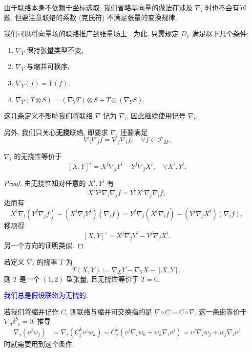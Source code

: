 \begin{remark}
	由于联络本身不依赖于坐标选取, 我们省略基向量的做法在涉及 $\nabla_i$ 时也不会有问题. 但要注意联络的系数 (克氏符) 不满足张量的变换规律.
\end{remark}
我们可以将向量场的联络推广到张量场上 \cite[\S 6.2.2]{陈维桓2013微分几何引论}. 为此, 只需规定 $D_Y$ 满足以下几个条件:
\begin{enumerate}
	\item $\nabla_Y$ 保持张量类型不变,
	\item $\nabla_Y$ 与缩并可换序,
	\item $\nabla_Y(f)=Y(f)$,
	\item $\nabla_Y(T\otimes S)=(\nabla_YT)\otimes S+T\otimes(\nabla_YS)$.
\end{enumerate}
\begin{remark}
	这几条定义不影响我们将联络 $\nabla$ 记为 $\nabla_i$, 因此继续使用记号 $\nabla_i$.
\end{remark}
另外, 我们只关心{\bf 无挠}联络, 即要求 $\nabla_i$ 还要满足
\[ \nabla_i\nabla_j f=\nabla_j\nabla_i f,\quad \forall f\in\mathcal{F}_M. \] 

\begin{theorem}
\label{torsion} 
	$\nabla_i$ 的无挠性等价于
	\[ [X,Y]^i=X^j\nabla_jY^i-Y^j\nabla_jX^i,\quad \forall X^i,Y^i. \]
\end{theorem}
\begin{proof}
	由无挠性知对任意的 $X^i,Y^i$ 有
	\[ X^iY^j\nabla_i\nabla_j f=Y^jX^i\nabla_j\nabla_i f, \]
	进而有
	\[ X^i\nabla_i(Y^j\nabla_j f)-(X^i\nabla_iY^j)(\nabla_j f)=Y^j\nabla_j(X^i\nabla_i f)-(Y^j\nabla_jX^i)(\nabla_if), \]
	移项得
	\[ [X,Y]^i=X^j\nabla_jY^i-Y^j\nabla_jX^i. \] 
	另一个方向的证明类似.
\end{proof}

\begin{remark}
	若定义 $\nabla_i$ 的挠率 $T$ 为
	\[ T(X,Y):=\nabla_XY-\nabla_YX-[X,Y], \] 
	则 $T$ 是一个 $(1,2)$ 型张量, 且无挠性等价于 $T=0$.
\end{remark}

\textcolor{blue}{我们总是假设联络为无挠的.}

\begin{remark}
	若我们将缩并记作 $C$, 则联络与缩并可交换指的是 $\nabla\circ C=C\circ\nabla$, 这一条街等价于 $\nabla_a\delta^b{}_c=0$. 推导
	\begin{align*}
		\nabla_i(v^jw_j)&=\nabla_i(C^k_{j}v^jw_k)=C^k_{j}(v^j\nabla_i w_k+w_k\nabla_iv^j)=v^j\nabla_i w_j+w_j\nabla_iv^j
	\end{align*}
	时就需要用到这个条件.
\end{remark}

